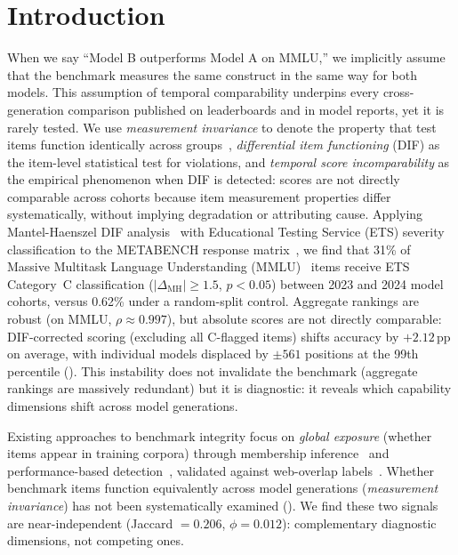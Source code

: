 \section{Introduction}
\label{sec:introduction}

When we say ``Model B outperforms Model A on MMLU,'' we implicitly assume that the benchmark measures the same construct in the same way for both models. This assumption of temporal comparability underpins every cross-generation comparison published on leaderboards and in model reports, yet it is rarely tested. We use \emph{measurement invariance} to denote the property that test items function identically across groups~\citep{meredith1993invariance}, \emph{differential item functioning} (DIF) as the item-level statistical test for violations, and \emph{temporal score incomparability} as the empirical phenomenon when DIF is detected: scores are not directly comparable across cohorts because item measurement properties differ systematically, without implying degradation or attributing cause. Applying Mantel-Haenszel DIF analysis~\citep{holland1988mh} with Educational Testing Service (ETS) severity classification to the METABENCH response matrix~\citep{kipnis2024metabench}, we find that 31\% of Massive Multitask Language Understanding (MMLU)~\citep{hendrycks2021mmlu} items receive ETS Category~C classification ($|\Delta_{\mathrm{MH}}| \geq 1.5$, $p < 0.05$) between 2023 and 2024 model cohorts, versus 0.62\% under a random-split control. Aggregate rankings are robust (on MMLU, $\rho \approx 0.997$), but absolute scores are not directly comparable: DIF-corrected scoring (excluding all C-flagged items) shifts accuracy by ${+}2.12$\,pp on average, with individual models displaced by ${\pm}561$ positions at the 99th percentile (). This instability does not invalidate the benchmark (aggregate rankings are massively redundant) but it is diagnostic: it reveals which capability dimensions shift across model generations.

Existing approaches to benchmark integrity focus on \emph{global exposure} (whether items appear in training corpora) through membership inference~\citep{shi2024mink} and performance-based detection~\citep{dekoninck2024constat,liang2026dvd,tao2026selfcritique}, validated against web-overlap labels~\citep{li2024contamination}. Whether benchmark items function equivalently across model generations (\emph{measurement invariance}) has not been systematically examined (). We find these two signals are near-independent (Jaccard $= 0.206$, $\phi = 0.012$): complementary diagnostic dimensions, not competing ones.

